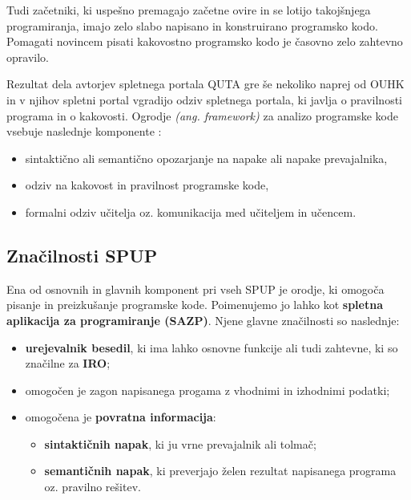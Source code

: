 Tudi začetniki, ki uspešno premagajo začetne ovire in se lotijo
takojšnjega programiranja, imajo zelo slabo napisano in konstruirano
programsko kodo. Pomagati novincem pisati kakovostno programsko kodo
je časovno zelo zahtevno opravilo.


Rezultat dela avtorjev spletnega portala QUTA gre še nekoliko naprej
od OUHK in v njihov spletni portal vgradijo odziv spletnega portala,
ki javlja o pravilnosti programa in o kakovosti. Ogrodje
\emph{(ang. framework)} za analizo programske kode vsebuje naslednje
komponente \cite{thesisAWebP}:

\begin{itemize}
\tightlist
\item
  sintaktično ali semantično opozarjanje na napake ali napake
  prevajalnika,
\item
  odziv na kakovost in pravilnost programske kode,
\item
  formalni odziv učitelja oz. komunikacija med učiteljem in učencem.
\end{itemize}

\subsection{Značilnosti SPUP}
\label{sec:značilnosti_spup}

Ena od osnovnih in glavnih komponent pri vseh SPUP je orodje, ki
omogoča pisanje in preizkušanje programske kode. Poimenujemo jo lahko
kot \textbf{spletna aplikacija za programiranje (SAZP)}. Njene
glavne značilnosti so naslednje:

\begin{itemize}
  \item \textbf{urejevalnik besedil}, ki ima lahko osnovne funkcije ali tudi
  zahtevne, ki so značilne za \textbf{IRO};
\item omogočen je zagon napisanega progama z vhodnimi in izhodnimi
  podatki;
\item omogočena je \textbf{povratna informacija}:
  \begin{itemize}
    \tightlist
  \item \textbf{sintaktičnih napak}, ki ju vrne prevajalnik ali tolmač;
  \item \textbf{semantičnih napak}, ki preverjajo želen rezultat napisanega
    programa oz. pravilno rešitev.
  \end{itemize}
\end{itemize}

